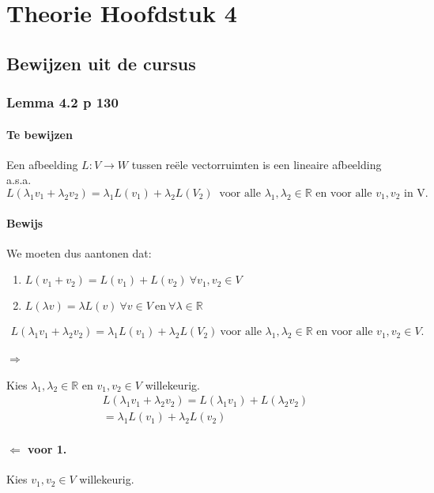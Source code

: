 \documentclass[lineaire_algebra_oplossingen.tex]{subfiles}
\begin{document}
\chapter{Theorie Hoofdstuk 4}
\section{Bewijzen uit de cursus}
\subsection{Lemma 4.2 p 130}
\subsubsection*{Te bewijzen}
Een afbeelding $L:V\rightarrow W$ tussen re\"ele vectorruimten is een lineaire afbeelding a.s.a.
$$L(\lambda_1v_1+\lambda_2v_2) = \lambda_1L(v_1)+\lambda_2L(V_2)\ \text{ voor alle } \lambda_1,\lambda_2 \in \mathbb{R} \text{ en voor alle } v_1,v_2 \text{ in V.}$$
\subsubsection*{Bewijs}
We moeten dus aantonen dat:
\begin{enumerate}
\item $L(v_1+v_2) = L(v_1) + L(v_2) \ \forall v_1,v_2 \in V$
\item $L(\lambda v) = \lambda L(v) \ \forall v \in V \ \text{en} \ \forall \lambda \in \mathbb{R}$
\end{enumerate}
\begin{align*}L(\lambda_1v_1+\lambda_2v_2) = \lambda_1L(v_1)+\lambda_2L(V_2)\ \text{voor alle $\lambda_1,\lambda_2 \in \mathbb{R}$ en voor alle $v_1,v_2 \in V$}. \tag{3.}
\end{align*}

\subsubsection*{$\Rightarrow$}
Kies $\lambda_1,\lambda_2 \in \mathbb{R}$ en $v_1,v_2 \in V$ willekeurig.
\begin{align*}
L(\lambda_1 v_1 + \lambda_2 v_2) = L(\lambda_1 v_1) + L(\lambda_2 v_2)\tag{wegens 1.}\\
=\lambda_1 L(v_1)+ \lambda_2 L(v_2) \tag{wegens 2.}
\end{align*}

\subsubsection*{$\Leftarrow$ voor 1.}
Kies $v_1,v_2 \in V$ willekeurig.
\end{document}
